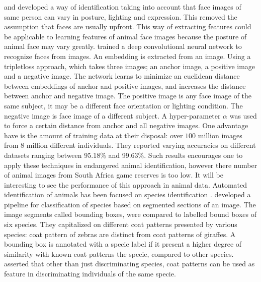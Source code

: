  \citeauthor{schroff2015facenet} \citeyear{schroff2015facenet} \cite{schroff2015facenet}  and \citeauthor{parkhi2015deep} \citeyear{parkhi2015deep} \cite{parkhi2015deep} developed a way of identification taking into account that face images of same person can vary in posture, lighting and expression. This removed the assumption that faces are usually upfront. This way of extracting features could be applicable to learning  features of animal face images because the posture of animal face may vary greatly. \citeauthor{schroff2015facenet} \citeyear{schroff2015facenet} \cite{schroff2015facenet} trained a deep convolutional neural network to recognize faces from images. An embedding is extracted from an image. Using a tripletloss approach, which takes three images; an anchor image, a positive image and a negative image. The network learns to minimize an euclidean distance between embeddings of anchor and positive images, and increases the distance between anchor and negative image. The positive image is any face image of the same subject, it may be a different face orientation or lighting condition. The negative image is face image of a different subject. A hyper-parameter $\alpha$ was used to force a certain distance from anchor and all negative images. One advantage \citeauthor{schroff2015facenet} \citeyear{schroff2015facenet} \cite{schroff2015facenet} have is the amount of training data at their disposal: over  $100$ million images from $8$ million different individuals. They reported varying accuracies on different datasets ranging between 95.18\% and 99.63\%. Such results encourages one to apply these techniques in endangered animal identification, however there number of animal images from South Africa game reserves is too low. It will be interesting to see the performance of this approach in animal data. 
Automated identification of animals has been focused on species identification \cite{parham2018animal}. \citeauthor{norouzzadeh2018automatically} \citeyear{norouzzadeh2018automatically} \cite{norouzzadeh2018automatically} developed a pipeline for classification of species based on segmented sections of an image. The image segments called bounding boxes, were compared to labelled bound boxes of six species. They capitalized on different coat patterns presented by various species: coat pattern of zebras are distinct from coat patterns of giraffes. A bounding box is annotated with a specie label if it present a higher degree of similarity with known coat patterns the specie, compared to other species. \citeauthor{kuhl2013animal} \citeyear{kuhl2013animal} \cite{kuhl2013animal} asserted that other than just discriminating species, coat patterns can be used as feature in discriminating individuals of the same specie.

